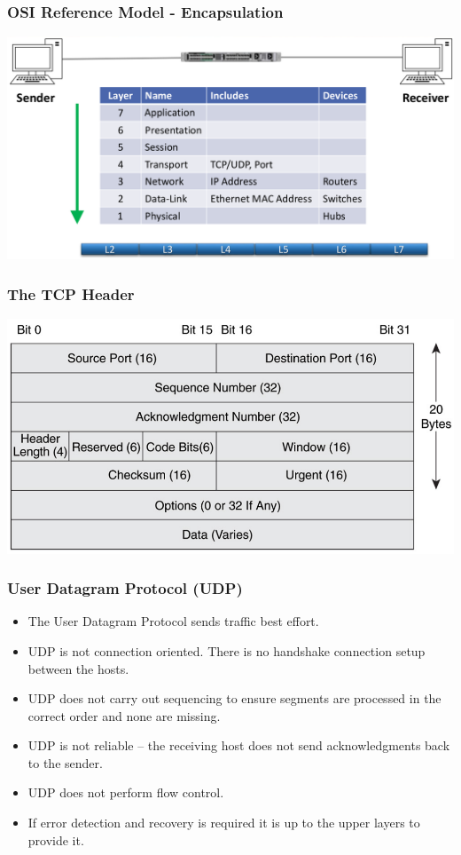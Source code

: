 \documentclass[pdflatex,compress]{beamer}
\begin{document}
\begin{frame}
	\frametitle{OSI Reference Model - Encapsulation}
	\begin{center}
		\includegraphics[width=\linewidth]{img/img11}
	\end{center}
\end{frame}

\begin{frame}
	\frametitle{The TCP Header}
	\begin{center}
		\includegraphics[width=\linewidth]{img/img12}
	\end{center}
\end{frame}

\begin{frame}
	\frametitle{User Datagram Protocol (UDP)}
	\begin{itemize}
		\item The User Datagram Protocol sends traffic best effort.
		\item UDP is not connection oriented. There is no handshake connection setup between the hosts.
		\item UDP does not carry out sequencing to ensure segments are processed in the correct order and none are missing.
		\item UDP is not reliable – the receiving host does not send acknowledgments back to the sender.
		\item UDP does not perform flow control.
		\item If error detection and recovery is required it is up to the upper layers to provide it.
	\end{itemize}
\end{frame}
\end{document}
